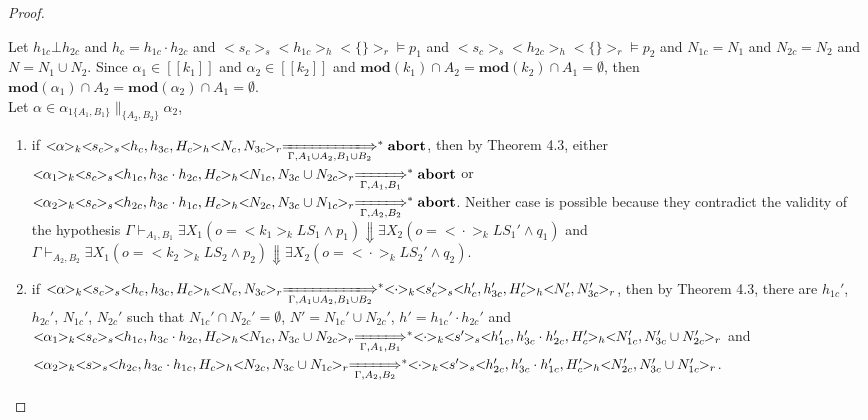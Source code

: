 \documentclass{lmcs} %
\theoremstyle{plain}\newtheorem{satz}[thm]{Satz} %
\begin{document}
\begin{proof}
\begin{itemize}
\begin{enumerate}
       \end{enumerate}
       Let $h_{1c}\bot h_{2c}$ and $h_c=h_{1c}\cdot h_{2c}$ and $<\!\!s_c\!\!>_s<\!\!h_{1c}\!\!>_h<\!\!\{\}\!\!>_r\models p_1$ and $<\!\!s_c\!\!>_s<\!\!h_{2c}\!\!>_h<\!\!\{\}\!\!>_r\models p_2$ and $N_{1c}=N_1$ and $N_{2c}=N_2$ and $N=N_1\cup N_2$.
       Since $\alpha_1\in [\![k_1]\!]$ and $\alpha_2\in [\![k_2]\!]$ and $\mathbf{mod}(k_1) \cap A_2=\mathbf{mod}(k_2) \cap A_1 =\emptyset$, then $\mathbf{mod}(\alpha_1)\cap A_2=\mathbf{mod}(\alpha_2)\cap A_1=\emptyset$.\\
       Let $\alpha\in \alpha_{1\{A_1,B_1\}}\|_{\{A_2,B_2\}}\alpha_2$,
       \begin{enumerate}
         \item if $<\!\!\alpha\!\!>_k<\!\!s_c\!\!>_s<\!\!h_{c},h_{3c},H_c\!\!>_h<\!\!N_{c},N_{3c}\!\!>_r\xLongrightarrow[\Gamma, A_1\cup A_2, B_1\cup B_2]{}^*\mathbf{abort}$, then by Theorem 4.3, either $<\!\!\alpha_1\!\!>_k<\!\!s_c\!\!>_s<\!\!h_{1c},h_{3c}\cdot h_{2c}, H_c\!\!>_h<\!\!N_{1c},N_{3c}\cup N_{2c}\!\!>_r\xLongrightarrow[\Gamma, A_1, B_1]{}^*\mathbf{abort}$ or $<\!\!\alpha_2\!\!>_k<\!\!s_c\!\!>_s<\!\!h_{2c},h_{3c}\cdot h_{1c},H_c\!\!>_h<\!\!N_{2c},N_{3c}\cup N_{1c}\!\!>_r\xLongrightarrow[\Gamma, A_2, B_2]{}^*\mathbf{abort}$. Neither case is possible because they contradict the validity of the hypothesis $\Gamma \vdash_{A_1,B_1} \exists X_1(o=<\!\!k_1\!\!>_k LS_1\land p_1)\Downarrow\exists X_2(o=<\!\!\cdot\!\!>_k LS_1'\land q_1)$ and $\Gamma \vdash_{A_2,B_2} \exists X_1(o=<\!\!k_2\!\!>_k LS_2\land p_2)\Downarrow\exists X_2(o=<\!\!\cdot\!\!>_k LS_2'\land q_2)$.
         \item if $<\!\!\alpha\!\!>_k<\!\!s_c\!\!>_s<\!\!h_{c},h_{3c},H_c\!\!>_h<\!\!N_{c},N_{3c}\!\!>_r\xLongrightarrow[\Gamma, A_1\cup A_2, B_1\cup B_2]{}^*<\!\!\cdot\!\!>_k<\!\!s_c'\!\!>_s<\!\!h_{c}',h_{3c}',H_c'\!\!>_h<\!\!N_{c}',N_{3c}'\!\!>_r$, then by Theorem 4.3, there are $h_{1c}'$, $h_{2c}'$, $N_{1c}'$, $N_{2c}'$ such that $N_{1c}'\cap N_{2c}'=\emptyset$, $N'=N_{1c}'\cup N_{2c}'$, $h'=h_{1c}'\cdot h_{2c}'$ and
      $<\!\!\alpha_1\!\!>_k<\!\!s_c\!\!>_s<\!\!h_{1c},h_{3c}\cdot h_{2c},H_c\!\!>_h<\!\!N_{1c},N_{3c}\cup N_{2c}\!\!>_r\xLongrightarrow[\Gamma, A_1, B_1]{}^*<\!\!\cdot\!\!>_k<\!\!s'\!\!>_s<\!\!h_{1c}',h_{3c}'\cdot h_{2c}',H_c'\!\!>_h<\!\!N_{1c}',N_{3c}'\cup N_{2c}'\!\!>_r$ and $<\!\!\alpha_2\!\!>_k<\!\!s\!\!>_s<\!\!h_{2c},h_{3c}\cdot h_{1c},H_c\!\!>_h<\!\!N_{2c},N_{3c}\cup N_{1c}\!\!>_r\xLongrightarrow[\Gamma, A_2, B_2]{}^*<\!\!\cdot\!\!>_k<\!\!s'\!\!>_s<\!\!h_{2c}',h_{3c}'\cdot h_{1c}',H_c'\!\!>_h<\!\!N_{2c}',N_{3c}'\cup N_{1c}'\!\!>_r$.\\

\end{enumerate}
\end{itemize}
\end{proof}
\end{document}
